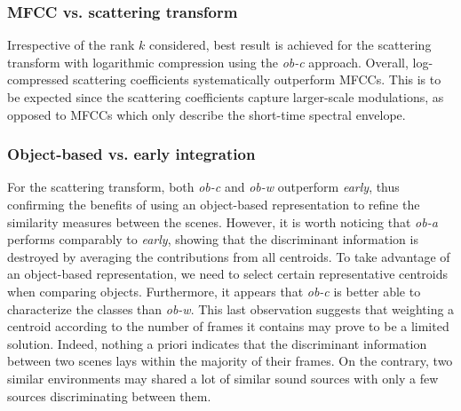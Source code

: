 \documentclass[journal]{IEEEtran}
\makeatletter
\newcommand*{\vs}{vs.\@\xspace}
\makeatother
\begin{document}
\subsubsection*{MFCC \vs scattering transform}

Irrespective of the rank $k$ considered, best result is achieved for the scattering transform with logarithmic compression using the \emph{ob-c} approach. Overall, log-compressed scattering coefficients systematically outperform MFCCs. This is to be expected since the scattering coefficients capture larger-scale modulations, as opposed to MFCCs which only describe the short-time spectral envelope.

\subsubsection*{Object-based \vs early integration}

For the scattering transform, both \emph{ob-c} and \emph{ob-w} outperform \emph{early}, thus confirming the benefits of using an object-based representation to refine the similarity measures between the scenes. However, it is worth noticing that \emph{ob-a} performs comparably to \emph{early}, showing that the discriminant information is destroyed by averaging the contributions from all centroids. To take advantage of an object-based representation, we need to select certain representative centroids when comparing objects. Furthermore, it appears that \emph{ob-c} is better able to characterize the classes than \emph{ob-w}. This last observation suggests that weighting a centroid according to the number of frames it contains may prove to be a limited solution. Indeed, nothing a priori indicates that the discriminant information between two scenes lays within the majority of their frames. On the contrary, two similar environments may shared a lot of similar sound sources with only a few sources discriminating between them.

	
\end{document}
